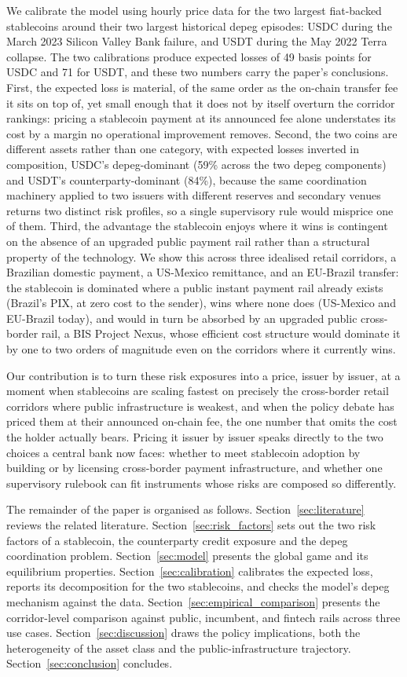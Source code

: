 We calibrate the model using hourly price data for the two largest fiat-backed stablecoins around their two largest historical depeg episodes: USDC during the March 2023 Silicon Valley Bank failure, and USDT during the May 2022 Terra collapse. The two calibrations produce expected losses of 49 basis points for USDC and 71 for USDT, and these two numbers carry the paper's conclusions. First, the expected loss is material, of the same order as the on-chain transfer fee it sits on top of, yet small enough that it does not by itself overturn the corridor rankings: pricing a stablecoin payment at its announced fee alone understates its cost by a margin no operational improvement removes. Second, the two coins are different assets rather than one category, with expected losses inverted in composition, USDC's depeg-dominant (59\% across the two depeg components) and USDT's counterparty-dominant (84\%), because the same coordination machinery applied to two issuers with different reserves and secondary venues returns two distinct risk profiles, so a single supervisory rule would misprice one of them. Third, the advantage the stablecoin enjoys where it wins is contingent on the absence of an upgraded public payment rail rather than a structural property of the technology. We show this across three idealised retail corridors, a Brazilian domestic payment, a US-Mexico remittance, and an EU-Brazil transfer: the stablecoin is dominated where a public instant payment rail already exists (Brazil's PIX, at zero cost to the sender), wins where none does (US-Mexico and EU-Brazil today), and would in turn be absorbed by an upgraded public cross-border rail, a BIS Project Nexus, whose efficient cost structure would dominate it by one to two orders of magnitude even on the corridors where it currently wins.

Our contribution is to turn these risk exposures into a price, issuer by issuer, at a moment when stablecoins are scaling fastest on precisely the cross-border retail corridors where public infrastructure is weakest, and when the policy debate has priced them at their announced on-chain fee, the one number that omits the cost the holder actually bears. Pricing it issuer by issuer speaks directly to the two choices a central bank now faces: whether to meet stablecoin adoption by building or by licensing cross-border payment infrastructure, and whether one supervisory rulebook can fit instruments whose risks are composed so differently.

The remainder of the paper is organised as follows. Section~\ref{sec:literature} reviews the related literature. Section~\ref{sec:risk_factors} sets out the two risk factors of a stablecoin, the counterparty credit exposure and the depeg coordination problem. Section~\ref{sec:model} presents the global game and its equilibrium properties. Section~\ref{sec:calibration} calibrates the expected loss, reports its decomposition for the two stablecoins, and checks the model's depeg mechanism against the data. Section~\ref{sec:empirical_comparison} presents the corridor-level comparison against public, incumbent, and fintech rails across three use cases. Section~\ref{sec:discussion} draws the policy implications, both the heterogeneity of the asset class and the public-infrastructure trajectory. Section~\ref{sec:conclusion} concludes.
